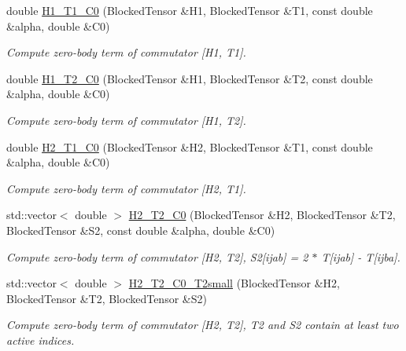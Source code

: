 \begin{DoxyCompactItemize}
\item 
double \mbox{\hyperlink{classforte_1_1_s_a_d_s_r_g_a06df78fa6b6091aa0c628c7b75b651f5}{H1\+\_\+\+T1\+\_\+\+C0}} (Blocked\+Tensor \&H1, Blocked\+Tensor \&T1, const double \&alpha, double \&C0)
\begin{DoxyCompactList}\small\item\em Compute zero-\/body term of commutator \mbox{[}H1, T1\mbox{]}. \end{DoxyCompactList}\item 
double \mbox{\hyperlink{classforte_1_1_s_a_d_s_r_g_ab9ba2f9f724835ca7817b4fe0ebdccf0}{H1\+\_\+\+T2\+\_\+\+C0}} (Blocked\+Tensor \&H1, Blocked\+Tensor \&T2, const double \&alpha, double \&C0)
\begin{DoxyCompactList}\small\item\em Compute zero-\/body term of commutator \mbox{[}H1, T2\mbox{]}. \end{DoxyCompactList}\item 
double \mbox{\hyperlink{classforte_1_1_s_a_d_s_r_g_a6f0151aa9194af398191f64ce3748653}{H2\+\_\+\+T1\+\_\+\+C0}} (Blocked\+Tensor \&H2, Blocked\+Tensor \&T1, const double \&alpha, double \&C0)
\begin{DoxyCompactList}\small\item\em Compute zero-\/body term of commutator \mbox{[}H2, T1\mbox{]}. \end{DoxyCompactList}\item 
std\+::vector$<$ double $>$ \mbox{\hyperlink{classforte_1_1_s_a_d_s_r_g_aeb64dd6b258a9c61e732fa87b06c63da}{H2\+\_\+\+T2\+\_\+\+C0}} (Blocked\+Tensor \&H2, Blocked\+Tensor \&T2, Blocked\+Tensor \&S2, const double \&alpha, double \&C0)
\begin{DoxyCompactList}\small\item\em Compute zero-\/body term of commutator \mbox{[}H2, T2\mbox{]}, S2\mbox{[}ijab\mbox{]} = 2 $\ast$ T\mbox{[}ijab\mbox{]} -\/ T\mbox{[}ijba\mbox{]}. \end{DoxyCompactList}\item 
std\+::vector$<$ double $>$ \mbox{\hyperlink{classforte_1_1_s_a_d_s_r_g_af38674aab57174e1f7c09251879e8682}{H2\+\_\+\+T2\+\_\+\+C0\+\_\+\+T2small}} (Blocked\+Tensor \&H2, Blocked\+Tensor \&T2, Blocked\+Tensor \&S2)
\begin{DoxyCompactList}\small\item\em Compute zero-\/body term of commutator \mbox{[}H2, T2\mbox{]}, T2 and S2 contain at least two active indices. \end{DoxyCompactList}\item 

\end{DoxyCompactItemize}
